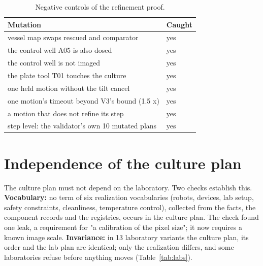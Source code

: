 \documentclass[10pt,a4paper]{article}
\begin{document}
\begin{table}[tbp]\centering\small
\caption{Negative controls of the refinement proof.}\label{tab:negative}
\begin{tabularx}{\linewidth}{Xl}\toprule
\textbf{Mutation} & \textbf{Caught} \\\midrule
vessel map swaps rescued and comparator & yes \\
the control well A05 is also dosed & yes \\
the control well is not imaged & yes \\
the plate tool T01 touches the culture & yes \\
one held motion without the tilt cancel & yes \\
one motion's timeout beyond V3's bound (1.5 x) & yes \\
a motion that does not refine its step & yes \\
step level: the validator's own 10 mutated plans & yes \\\bottomrule
\end{tabularx}
\end{table}

\section{Independence of the culture plan}\label{sec:indep}

The culture plan must not depend on the laboratory. Two checks establish this. \textbf{Vocabulary:} no term of six realization vocabularies (robots, devices, lab setup, safety constraints, cleanliness, temperature control), collected from the facts, the component records and the registries, occurs in the culture plan. The check found one leak, a requirement for "a calibration of the pixel size"; it now requires a known image scale. \textbf{Invariance:} in 13 laboratory variants the culture plan, its order and the lab plan are identical; only the realization differs, and some laboratories refuse before anything moves (Table~\ref{tab:labs}).
\end{document}
